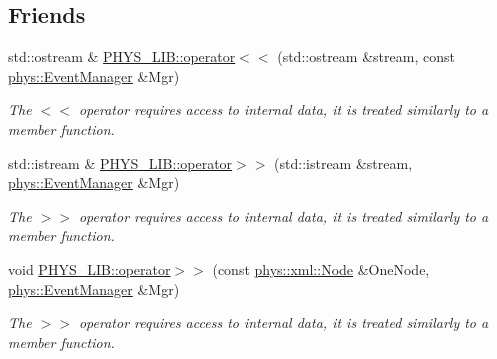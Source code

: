 \subsection*{Friends}
\begin{DoxyCompactItemize}
\item 
std::ostream \& \hyperlink{classphys_1_1EventManager_ad68113acdef0b428e8180ee4192aca09}{PHYS\_\-LIB::operator$<$$<$} (std::ostream \&stream, const \hyperlink{classphys_1_1EventManager}{phys::EventManager} \&Mgr)
\begin{DoxyCompactList}\small\item\em The $<$$<$ operator requires access to internal data, it is treated similarly to a member function. \item\end{DoxyCompactList}\item 
std::istream \& \hyperlink{classphys_1_1EventManager_ac32b5a1ad8a8171298bd544eda444865}{PHYS\_\-LIB::operator$>$$>$} (std::istream \&stream, \hyperlink{classphys_1_1EventManager}{phys::EventManager} \&Mgr)
\begin{DoxyCompactList}\small\item\em The $>$$>$ operator requires access to internal data, it is treated similarly to a member function. \item\end{DoxyCompactList}\item 
void \hyperlink{classphys_1_1EventManager_a04e666d9104e325839dc9a6e63cd3c6f}{PHYS\_\-LIB::operator$>$$>$} (const \hyperlink{classphys_1_1xml_1_1Node}{phys::xml::Node} \&OneNode, \hyperlink{classphys_1_1EventManager}{phys::EventManager} \&Mgr)
\begin{DoxyCompactList}\small\item\em The $>$$>$ operator requires access to internal data, it is treated similarly to a member function. \item\end{DoxyCompactList}\end{DoxyCompactItemize}


